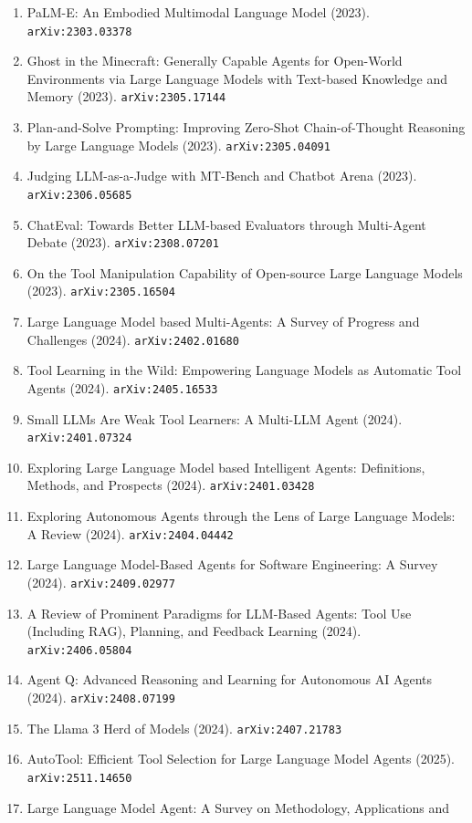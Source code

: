 \documentclass[11pt]{article}
\begin{document}
\begin{enumerate}
  Tool Embeddings (2023). \texttt{arXiv:2305.11554}
  \item PaLM-E: An Embodied Multimodal Language Model (2023). \texttt{arXiv:2303.03378}
  \item Ghost in the Minecraft: Generally Capable Agents for Open-World
  Environments via Large Language Models with Text-based Knowledge and Memory (2023). \texttt{arXiv:2305.17144}
  \item Plan-and-Solve Prompting: Improving Zero-Shot Chain-of-Thought Reasoning
  by Large Language Models (2023). \texttt{arXiv:2305.04091}
  \item Judging LLM-as-a-Judge with MT-Bench and Chatbot Arena (2023). \texttt{arXiv:2306.05685}
  \item ChatEval: Towards Better LLM-based Evaluators through Multi-Agent Debate (2023). \texttt{arXiv:2308.07201}
  \item On the Tool Manipulation Capability of Open-source Large Language Models (2023). \texttt{arXiv:2305.16504}
  \item Large Language Model based Multi-Agents: A Survey of Progress and
  Challenges (2024). \texttt{arXiv:2402.01680}
  \item Tool Learning in the Wild: Empowering Language Models as Automatic Tool
  Agents (2024). \texttt{arXiv:2405.16533}
  \item Small LLMs Are Weak Tool Learners: A Multi-LLM Agent (2024). \texttt{arXiv:2401.07324}
  \item Exploring Large Language Model based Intelligent Agents: Definitions,
  Methods, and Prospects (2024). \texttt{arXiv:2401.03428}
  \item Exploring Autonomous Agents through the Lens of Large Language Models: A
  Review (2024). \texttt{arXiv:2404.04442}
  \item Large Language Model-Based Agents for Software Engineering: A Survey (2024). \texttt{arXiv:2409.02977}
  \item A Review of Prominent Paradigms for LLM-Based Agents: Tool Use
  (Including RAG), Planning, and Feedback Learning (2024). \texttt{arXiv:2406.05804}
  \item Agent Q: Advanced Reasoning and Learning for Autonomous AI Agents (2024). \texttt{arXiv:2408.07199}
  \item The Llama 3 Herd of Models (2024). \texttt{arXiv:2407.21783}
  \item AutoTool: Efficient Tool Selection for Large Language Model Agents (2025). \texttt{arXiv:2511.14650}
  \item Large Language Model Agent: A Survey on Methodology, Applications and

\end{enumerate}
\end{document}
